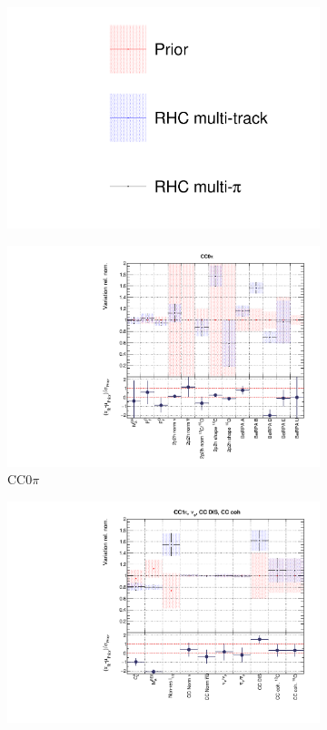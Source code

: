 \begin{figure}
\centering
\begin{subfigure}{0.95\textwidth}
  \centering
  \includegraphics[width=0.25\linewidth]{figs/rhcmpdat248_leg}
  \caption{}
  \label{fig:}
\end{subfigure}
\begin{subfigure}{0.49\textwidth}
  \centering
  \includegraphics[width=0.95\linewidth]{figs/rhcmpdatxsec248_1}
  \caption{CC0$\pi$}
  \label{fig:}
\end{subfigure}
\begin{subfigure}{0.49\textwidth}
  \centering
  \includegraphics[width=0.95\linewidth]{figs/rhcmpdatxsec248_2}

\end{subfigure}
\end{figure}
